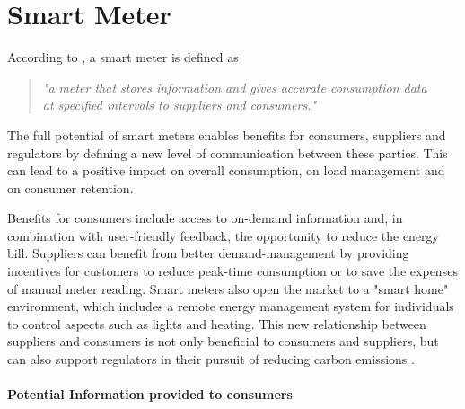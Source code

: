 \section{Smart Meter}
\label{ch:Content1:sec:Smart Meter}
According to \cite{Darby2008}, a smart meter is defined as
\begin{quotation}
\textit{"a meter that stores information and gives accurate consumption data\\ 
at specified intervals to suppliers and consumers."}
\end{quotation}

The full potential of smart meters enables benefits for consumers, suppliers and regulators by defining a new level of communication between these parties.  This can lead to a positive impact on overall consumption, on load management and on consumer retention.

Benefits for consumers include access to on-demand information and, in combination with user-friendly feedback, the opportunity to reduce the energy bill.
Suppliers can benefit from better demand-management by providing incentives for customers to reduce peak-time consumption or to save the expenses of manual meter reading. Smart meters also open the market to a "smart home" environment, which includes a remote energy management system for individuals to control aspects such as lights and heating.
This new relationship between suppliers and consumers is not only beneficial to consumers and suppliers, but can also support regulators in their pursuit of reducing carbon emissions  \citep{Darby2008}.

\paragraph{Potential Information provided to consumers}

